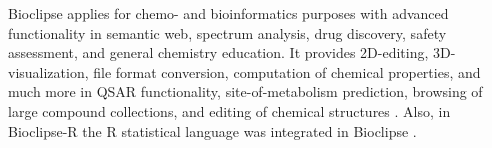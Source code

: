 Bioclipse applies for chemo- and bioinformatics purposes with advanced functionality in semantic web, spectrum analysis, drug discovery, safety assessment, and general chemistry education. It provides 2D-editing, 3D-visualization, file format conversion, computation of chemical properties, and much more in QSAR functionality, site-of-metabolism prediction, browsing of large compound collections, and editing of chemical structures \cite{Spjuth_2007} \cite{Spjuth_2009}. Also, in Bioclipse-R the R statistical language was integrated in Bioclipse \cite{Spjuth_2012}.